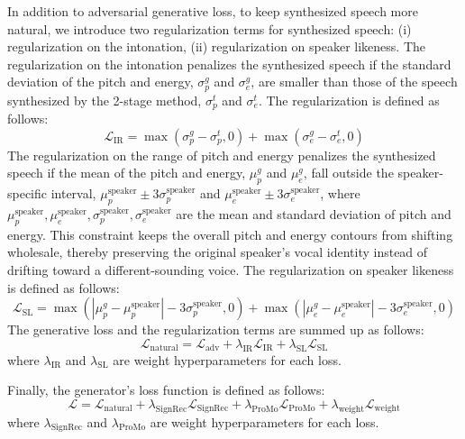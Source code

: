In addition to adversarial generative loss, to keep synthesized speech more natural, we introduce two regularization terms for synthesized speech: (i) regularization on the intonation, (ii) regularization on speaker likeness. The regularization on the intonation penalizes the synthesized speech if the standard deviation of the pitch and energy, $\sigma_{p}^{g}$ and $\sigma_{e}^{g}$, are smaller than those of the speech synthesized by the 2-stage method, $\sigma_{p}^{t}$ and $\sigma_{e}^{t}$. The regularization is defined as follows:
\begin{equation}
    \mathcal{L}_{\mathrm{IR}} = \max(\sigma_{p}^{g} - \sigma_{p}^{t}, 0) + \max(\sigma_{e}^{g} - \sigma_{e}^{t}, 0)
\end{equation}
The regularization on the range of pitch and energy penalizes the synthesized speech if the mean of the pitch and energy, $\mu_{p}^{g}$ and $\mu_{e}^{g}$, fall outside the speaker-specific interval, $\mu_{p}^{\mathrm{speaker}} \pm 3\sigma_{p}^{\mathrm{speaker}}$ and $\mu_{e}^{\mathrm{speaker}} \pm 3\sigma_{e}^{\mathrm{speaker}}$, where $\mu_{p}^{\mathrm{speaker}}, \mu_{e}^{\mathrm{speaker}}, \sigma_{p}^{\mathrm{speaker}}, \sigma_{e}^{\mathrm{speaker}}$ are the mean and standard deviation of pitch and energy. This constraint keeps the overall pitch and energy contours from shifting wholesale, thereby preserving the original speaker’s vocal identity instead of drifting toward a different-sounding voice. The regularization on speaker likeness is defined as follows:
\begin{equation}
    \mathcal{L}_{\mathrm{SL}} = \max(|\mu_{p}^{g} - \mu_{p}^{\mathrm{speaker}}| - 3\sigma_{p}^{\mathrm{speaker}}, 0) + \max(|\mu_{e}^{g} - \mu_{e}^{\mathrm{speaker}}| - 3\sigma_{e}^{\mathrm{speaker}}, 0)
\end{equation}
The generative loss and the regularization terms are summed up as follows:
\begin{equation}\label{eq:natural}
    \mathcal{L}_{\mathrm{natural}} = \mathcal{L}_{\mathrm{adv}} + \lambda_{\mathrm{IR}}\mathcal{L}_{\mathrm{IR}} + \lambda_{\mathrm{SL}}\mathcal{L}_{\mathrm{SL}} 
\end{equation}
where $\lambda_{\mathrm{IR}}$ and $\lambda_{\mathrm{SL}}$ are weight hyperparameters for each loss.

Finally, the generator's loss function is defined as follows:
\begin{equation}
    \mathcal{L} = \mathcal{L}_{\mathrm{natural}}+\lambda_{\mathrm{SignRec}}\mathcal{L}_{\mathrm{SignRec}}+\lambda_{\mathrm{ProMo}}\mathcal{L}_{\mathrm{ProMo}} + \lambda_{\mathrm{weight}} \mathcal{L}_{\mathrm{weight}}
\end{equation}
where $\lambda_{\mathrm{SignRec}}$ and $\lambda_{\mathrm{ProMo}}$ are weight hyperparameters for each loss.
